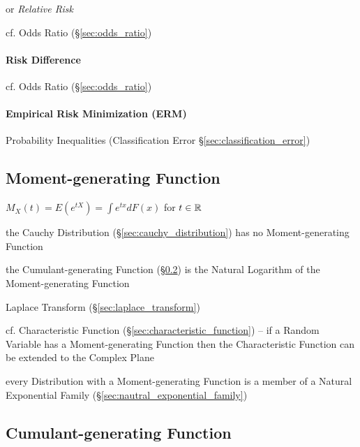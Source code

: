 or \emph{Relative Risk}

cf. Odds Ratio (\S\ref{sec:odds_ratio})



\paragraph{Risk Difference}\label{sec:risk_difference}\hfill

cf. Odds Ratio (\S\ref{sec:odds_ratio})



\paragraph{Empirical Risk Minimization (ERM)}\label{sec:erm}\hfill

Probability Inequalities (Classification Error \S\ref{sec:classification_error})



\subsection{Moment-generating Function}\label{sec:moment_generating_function}

$M_X(t) = E(e^{tX}) = \int e^{tx} dF(x)$ for $t \in \mathbb{R}$

the Cauchy Distribution (\S\ref{sec:cauchy_distribution}) has no
Moment-generating Function

the Cumulant-generating Function (\S\ref{sec:cumulant_generating_function}) is
the Natural Logarithm of the Moment-generating Function

\fist Laplace Transform (\S\ref{sec:laplace_transform})

cf. Characteristic Function (\S\ref{sec:characteristic_function}) --
if a Random Variable has a Moment-generating Function then the Characteristic
Function can be extended to the Complex Plane

every Distribution with a Moment-generating Function is a member of a Natural
Exponential Family (\S\ref{sec:nautral_exponential_family})



\subsection{Cumulant-generating Function}
\label{sec:cumulant_generating_function}

